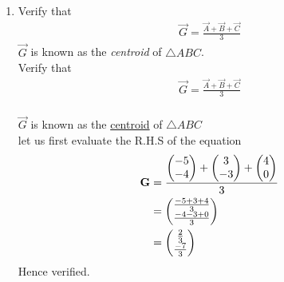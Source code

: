 \documentclass[10pt]{book}
\begin{document}
\begin{enumerate}[label=\thesection.\arabic*.,ref=\thesection.\theenumi]
\item Verify that 
		\begin{align}
			\vec{G}=\frac{\vec{A}+\vec{B}+\vec{C}}{3}
		\end{align}
$\vec{G}$ is known as the {\em centroid} of $\triangle ABC$.\\
Verify that\\
\begin{align}
 \vec{G}=\frac{\vec{A}+\vec{B}+\vec{C}}{3}   
\end{align}
\solution\\
$\vec{G}$ is known as the \underline{centroid} of $\triangle ABC$ \\
let us first evaluate the R.H.S of the equation
\begin{equation}
\begin{split}
\label{eq:centroid}
    \vec{G}&= \frac{\myvec{-5\\-4}+\myvec{3\\-3}+\myvec{4\\0}}{3}\\    
    &= \myvec{\frac{-5+3+4}{3} \\ \frac{-4-3+0}{3}}\\
     &= \myvec{\frac{2}{3}\\ \frac{-7}{3}}
\end{split}
\end{equation}
Hence verified.


\end{enumerate}
\end{document}
